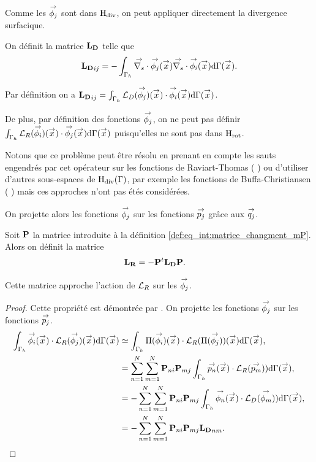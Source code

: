     Comme les \(\phij\) sont dans \(\Hdiv\), on peut appliquer directement la divergence surfacique.
    
    \begin{defn}
      On définit la matrice \(\mLD\) telle que
      \begin{align*}
          \mLD_{ij} = - \int_{\Gamma_h} \vdivs \phij(\vx) \vdivs \phii(\vx) \dd{\Gamma}(\vx).
      \end{align*}
    \end{defn}

    Par définition on a \(\mLD_{ij} = \int_{\Gamma_h} \LD(\phij)(\vx)\cdot\phii(\vx)\dd{\Gamma}(\vx)\).

    De plus, par définition des fonctions \(\phij\), on ne peut pas définir \( \int_{\Gamma_h} \LR(\phii)(\vx) \cdot \phij(\vx) \dd{\Gamma}(\vx)\) puisqu'elles ne sont pas dans \(\Hrot\).

    Notons que ce problème peut être résolu en prenant en compte les sauts engendrés par cet opérateur sur les fonctions de Raviart-Thomas ( \cite{soudais_3d_2017} ) ou d'utiliser d'autres sous-espaces de \(\Hdiv(\Gamma)\), par exemple les fonctions de Buffa-Christiansen ( \cite{yan_accuracy_2013} ) mais ces approches n'ont pas étés considérées.

    On projette alors les fonctions \(\phij\) sur les fonctions \(\pj\) grâce aux \(\qj\).
    \begin{defn}
      Soit \(\mPP\) la matrice introduite à la définition \ref{def:eq_int:matrice_changment_mP}. Alors on définit la matrice
      \begin{align*}
        \mLR & = -\mPP^t\mLD\mPP.
      \end{align*}
    \end{defn}
    \begin{prop}
      Cette matrice approche l'action de \(\LR\) sur les \(\phij\).
    \end{prop}
    \begin{proof}
      Cette propriété est démontrée par \cite[eq.~(17)]{stupfel_implementation_2015}. On projette les fonctions \(\phij\) sur les fonctions \(\pj\).
      \begin{align*}
        \int_{\Gamma_h} \phii(\vx) \cdot \LR(\phij)(\vx) \dd{\Gamma}(\vx) &\simeq \int_{\Gamma_h} \Pi(\phii)(\vx) \cdot \LR(\Pi(\phij)) (\vx) \dd{\Gamma}(\vx),
        \\
        &=\sum_{n=1}^{N} \sum_{m=1}^{N} \mPP_{ni} \mPP_{mj} \int_{\Gamma_h}\pn(\vx)\cdot\LR(\ppm)) \dd{\Gamma}(\vx),
        \\
        &=-\sum_{n=1}^{N} \sum_{m=1}^{N} \mPP_{ni} \mPP_{mj} \int_{\Gamma_h}\phin(\vx)\cdot\LD(\phim)) \dd{\Gamma}(\vx),
        \\
        &=-\sum_{n=1}^{N} \sum_{m=1}^{N} \mPP_{ni} \mPP_{mj} \mLD_{nm}.
      \end{align*}
    \end{proof}

